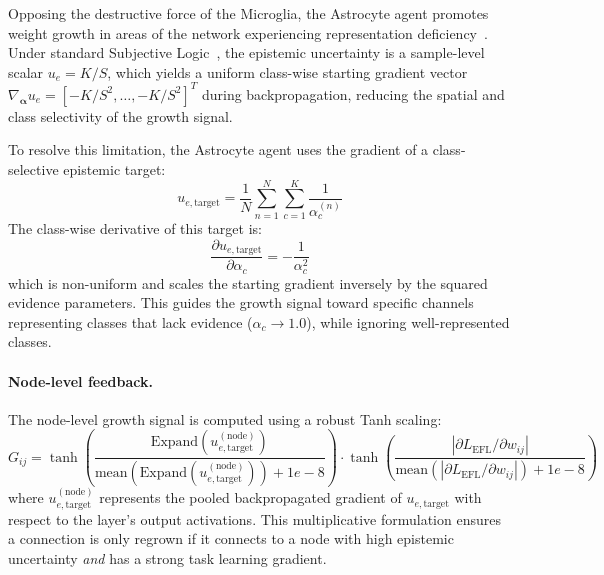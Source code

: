 \documentclass[letterpaper]{article} %
\begin{document}
Opposing the destructive force of the Microglia, the Astrocyte agent promotes weight growth in areas of the network experiencing representation deficiency~\cite{chung2013astrocytes, vainchtein2018astrocyte}. Under standard Subjective Logic~\cite{josang2016subjective}, the epistemic uncertainty is a sample-level scalar $u_e = K/S$, which yields a uniform class-wise starting gradient vector $\nabla_{\bm{\alpha}} u_e = [-K/S^2, \ldots, -K/S^2]^T$ during backpropagation, reducing the spatial and class selectivity of the growth signal.

To resolve this limitation, the Astrocyte agent uses the gradient of a class-selective epistemic target:
\begin{equation}\label{eq:u_e_target}
    u_{e,\text{target}} = \frac{1}{N} \sum_{n=1}^N \sum_{c=1}^K \frac{1}{\alpha_c^{(n)}}
\end{equation}
The class-wise derivative of this target is:
\begin{equation}\label{eq:u_e_target_deriv}
    \frac{\partial u_{e,\text{target}}}{\partial \alpha_c} = -\frac{1}{\alpha_c^2}
\end{equation}
which is non-uniform and scales the starting gradient inversely by the squared evidence parameters. This guides the growth signal toward specific channels representing classes that lack evidence ($\alpha_c \to 1.0$), while ignoring well-represented classes.

\paragraph{Node-level feedback.}
The node-level growth signal is computed using a robust Tanh scaling:
\begin{equation}\label{eq:G_ij}
    G_{ij} = \tanh\!\left(\frac{\text{Expand}(u_{e,\text{target}}^{(\text{node})})}{\text{mean}(\text{Expand}(u_{e,\text{target}}^{(\text{node})})) + 1e-8}\right) \cdot \tanh\!\left(\frac{|\partial L_{\text{EFL}} / \partial w_{ij}|}{\text{mean}(|\partial L_{\text{EFL}} / \partial w_{ij}|) + 1e-8}\right)
\end{equation}
where $u_{e,\text{target}}^{(\text{node})}$ represents the pooled backpropagated gradient of $u_{e,\text{target}}$ with respect to the layer's output activations. This multiplicative formulation ensures a connection is only regrown if it connects to a node with high epistemic uncertainty \emph{and} has a strong task learning gradient.
\end{document}
